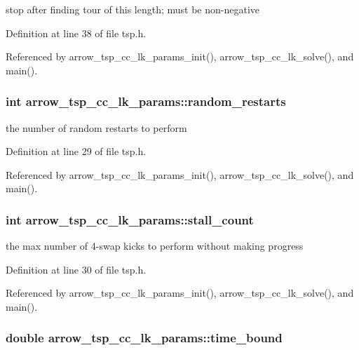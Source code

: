 stop after finding tour of this length; must be non-negative 

Definition at line 38 of file tsp.h.

Referenced by arrow\_\-tsp\_\-cc\_\-lk\_\-params\_\-init(), arrow\_\-tsp\_\-cc\_\-lk\_\-solve(), and main().\hypertarget{structarrow__tsp__cc__lk__params_291c8a0ec4208ae75229c223dcf1160a}{
\subsubsection[{random\_\-restarts}]{\setlength{\rightskip}{0pt plus 5cm}int {\bf arrow\_\-tsp\_\-cc\_\-lk\_\-params::random\_\-restarts}}}
\label{structarrow__tsp__cc__lk__params_291c8a0ec4208ae75229c223dcf1160a}


the number of random restarts to perform 

Definition at line 29 of file tsp.h.

Referenced by arrow\_\-tsp\_\-cc\_\-lk\_\-params\_\-init(), arrow\_\-tsp\_\-cc\_\-lk\_\-solve(), and main().\hypertarget{structarrow__tsp__cc__lk__params_dee46e401d6f6eca9f9a0d1f376c6ebe}{
\subsubsection[{stall\_\-count}]{\setlength{\rightskip}{0pt plus 5cm}int {\bf arrow\_\-tsp\_\-cc\_\-lk\_\-params::stall\_\-count}}}
\label{structarrow__tsp__cc__lk__params_dee46e401d6f6eca9f9a0d1f376c6ebe}


the max number of 4-swap kicks to perform without making progress 

Definition at line 30 of file tsp.h.

Referenced by arrow\_\-tsp\_\-cc\_\-lk\_\-params\_\-init(), arrow\_\-tsp\_\-cc\_\-lk\_\-solve(), and main().\hypertarget{structarrow__tsp__cc__lk__params_d4a71865c09d0624395d5a71b46bf8d5}{
\subsubsection[{time\_\-bound}]{\setlength{\rightskip}{0pt plus 5cm}double {\bf arrow\_\-tsp\_\-cc\_\-lk\_\-params::time\_\-bound}}}
\label{structarrow__tsp__cc__lk__params_d4a71865c09d0624395d5a71b46bf8d5}



